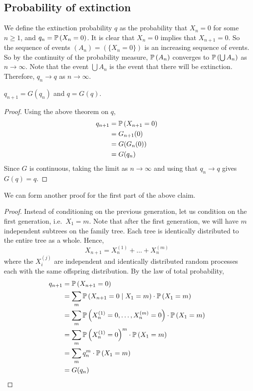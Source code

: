 \subsection{Probability of extinction}
We define the extinction probability \(q\) as the probability that \(X_n = 0\) for some \(n \geq 1\), and \(q_n = \mathbb{P}\left({X_n = 0}\right)\).
It is clear that \(X_n = 0\) implies that \(X_{n+1} = 0\).
So the sequence of events \((A_n) = (\{ X_n = 0 \})\) is an increasing sequence of events.
So by the continuity of the probability measure, \(\mathbb{P}\left({A_n}\right)\) converges to \(\mathbb{P}\left({\bigcup A_n}\right)\) as \(n \to \infty\).
Note that the event \(\bigcup A_n\) is the event that there will be extinction.
Therefore, \(q_n \to q\) as \(n \to \infty\).
\begin{claim}
	\(q_{n+1} = G(q_n)\) and \(q = G(q)\).
\end{claim}
\begin{proof}
	Using the above theorem on \(q\),
	\begin{align*}
		q_{n+1} & = \mathbb{P}\left({X_{n+1} = 0}\right) \\
		        & = G_{n+1}(0)         \\
		        & = G(G_n(0))          \\
		        & = G(q_n)
	\end{align*}
	Since \(G\) is continuous, taking the limit as \(n \to \infty\) and using that \(q_n \to q\) gives \(G(q) = q\).
\end{proof}
We can form another proof for the first part of the above claim.
\begin{proof}
	Instead of conditioning on the previous generation, let us condition on the first generation, i.e.\ \(X_1 = m\).
	Note that after the first generation, we will have \(m\) independent subtrees on the family tree.
	Each tree is identically distributed to the entire tree as a whole.
	Hence,
	\[
		X_{n+1} = X_n^{(1)} + \dots + X_n^{(m)}
	\]
	where the \(X_i^{(j)}\) are independent and identically distributed random processes each with the same offspring distribution.
	By the law of total probability,
	\begin{align*}
		q_{n+1} & = \mathbb{P}\left({X_{n+1} = 0}\right)                                                     \\
		        & = \sum_m \mathbb{P}\left({X_{n+1} = 0 \mid X_1 = m}\right) \cdot \mathbb{P}\left({X_1 = m}\right)            \\
		        & = \sum_m \mathbb{P}\left({X_n^{(1)} = 0, \dots, X_n^{(m)} = 0}\right) \cdot \mathbb{P}\left({X_1 = m}\right) \\
		        & = \sum_m \mathbb{P}\left({X_n^{(1)} = 0}\right)^m \cdot \mathbb{P}\left({X_1 = m}\right)                     \\
		        & = \sum_m q_n^m \cdot \mathbb{P}\left({X_1 = m}\right)                                      \\
		        & = G(q_n)
	\end{align*}
\end{proof}
